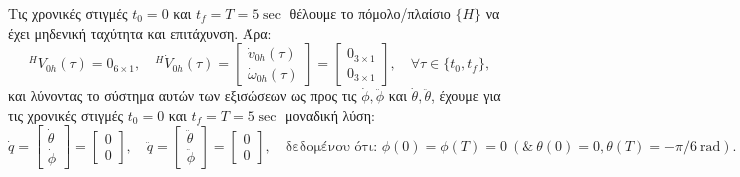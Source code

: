\documentclass[12pt]{article} %
\numberwithin{equation}{section}  %
\begin{document}
Τις χρονικές στιγμές $t_0 = 0$ και $t_f = T = 5 \sec$ θέλουμε το πόμολο/πλαίσιο $\{H\}$ να έχει μηδενική ταχύτητα και επιτάχυνση. Άρα:
\begin{equation}\label{eq:conditions_equations}
    ^{H}V_{0h}(\tau) = 0_{6 \times 1}, \quad 
    ^{H}\dot{V}_{0h}(\tau) = \begin{bmatrix}
        \dot{v}_{0h}(\tau) \\
        \dot{\omega}_{0h}(\tau)
    \end{bmatrix} = \begin{bmatrix}
         0_{3 \times 1} \\
         0_{3 \times 1}
    \end{bmatrix}, \quad
    \forall \tau \in \{ t_0, t_f \},
\end{equation}
και λύνοντας το σύστημα αυτών των εξισώσεων ως προς τις $\dot\phi, \ddot\phi$ και $\dot\theta, \ddot\theta$, έχουμε για τις χρονικές στιγμές $t_0 = 0$ και $t_f = T = 5 \sec$ μοναδική λύση:
\begin{equation}\label{eq:conditions}
    \dot{q} = \begin{bmatrix}
        \dot\theta \\ \dot\phi
    \end{bmatrix} = \begin{bmatrix}
        0 \\ 0
    \end{bmatrix}, \quad
    \ddot{q} = \begin{bmatrix}
        \ddot\theta \\ \ddot\phi
    \end{bmatrix} = \begin{bmatrix}
        0 \\ 0
    \end{bmatrix}, \quad \text{δεδομένου ότι: } \phi(0) = \phi(T) = 0\ (\& \ \theta(0) = 0, \theta(T) = -\pi/6~\mathrm{rad}).
\end{equation}
\end{document}
